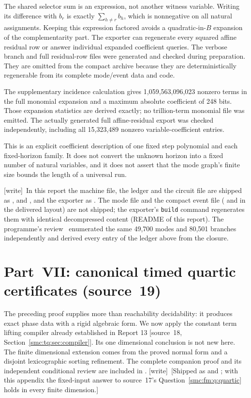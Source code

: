\documentclass[11pt,letterpaper]{article}
\numberwithin{equation}{section}
\theoremstyle{definition}
\theoremstyle{remark}
\newcommand{\wtag}{\textup{[write]}}
\newcommand{\file}[1]{\texttt{\detokenize{#1}}}
\begin{document}
The shared selector sum is an expression, not another witness variable. Writing its difference with $b_r$ is exactly $\sum_{h\ne r}b_h$, which is nonnegative on all natural assignments. Keeping this expression factored avoids a quadratic-in-$B$ expansion of the complementarity part. The exporter can regenerate every squared affine residual row or answer individual expanded coefficient queries. The verbose branch and full residual-row files were generated and checked during preparation. They are omitted from the compact archive because they are deterministically regenerable from its complete mode/event data and code.

The supplementary incidence calculation gives 1,059,563,096,023 nonzero terms in the full monomial expansion and a maximum absolute coefficient of 248 bits. Those expansion statistics are derived exactly; no trillion-term monomial file was emitted. The actually generated full affine-residual export was checked independently, including all 15,323,489 nonzero variable-coefficient entries.

This is an explicit coefficient description of one fixed step polynomial and each fixed-horizon family. It does not convert the unknown horizon into a fixed number of natural variables, and it does not assert that the mode graph's finite size bounds the length of a universal run.

\wtag\ In this report the machine file, the ledger and the circuit file are shipped as ,  and , and the exporter as . The mode file and the compact event file ( and  in the delivered layout) are not shipped; the exporter's \texttt{build} command regenerates them with identical decompressed content (README of this report). The programme's review~\cite{reviewcs} enumerated the same 49,700 modes and 80,501 branches independently and derived every entry of the ledger above from the closure.
\section{Part~VII: canonical timed quartic certificates (source~19)}\label{smc:zd:app:quartic}
The preceding proof supplies more than reachability decidability: it produces exact phase data with a rigid algebraic form. We now apply the constant term lifting compiler already established in Report 13 \textup{[source~18, Section~\ref{smc:tq:sec:compiler}]}. Its one dimensional conclusion is not new here. The finite dimensional extension comes from the proved normal form and a disjoint lexicographic sorting refinement. The complete companion proof and its independent conditional review are included in \file{scientific/timed/}. \wtag\ [Shipped as  and ; with this appendix the fixed-input answer to source~17's Question~\ref{smc:fm:q:quartic} holds in every finite dimension.]
\end{document}

